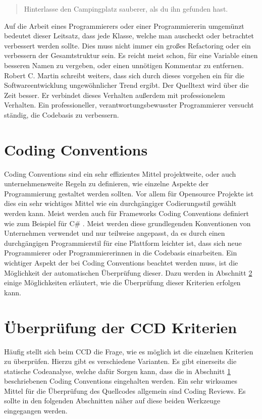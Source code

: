 \begin{quote}
	Hinterlasse den Campingplatz sauberer, als du ihn gefunden hast.
\end{quote}

\SuperPar Auf die Arbeit eines Programmierers oder einer Programmiererin umgemünzt bedeutet dieser Leitsatz, dass jede Klasse, welche man auscheckt oder betrachtet verbessert werden sollte. Dies muss nicht immer ein großes Refactoring oder ein verbessern der Gesamtstruktur sein. Es reicht meist schon, für eine Variable einen besseren Namen zu vergeben, oder einen unnötigen Kommentar zu entfernen. Robert C. Martin schreibt weiters, dass sich durch dieses vorgehen ein für die Softwareentwicklung ungewöhnlicher Trend ergibt. Der Quelltext wird über die Zeit besser. Er verbindet dieses Verhalten außerdem mit professionelem Verhalten. Ein professioneller, verantwortungsbewusster Programmierer versucht ständig, die Codebasis zu verbessern.

\section{Coding Conventions}
\label{cha:CodingConventions}
Coding Conventions sind ein sehr effizientes Mittel projektweite, oder auch unternehmensweite Regeln zu definieren, wie einzelne Aspekte der Programmierung gestaltet werden sollten. Vor allem für Opensource Projekte ist dies ein sehr wichtiges Mittel wie ein durchgängiger Codierungsstil gewählt werden kann. Meist werden auch für Frameworks Coding Conventions definiert wie zum Beispiel für C\# \cite{Microsoft2016}. Meist werden diese grundlegenden Konventionen von Unternehmen verwendet und nur teilweise angepasst, da es durch einen durchgängigen Programmierstil für eine Plattform leichter ist, dass sich neue Programmierer oder Programmiererinnen in die Codebasis einarbeiten. Ein wichtiger Aspekt der bei Coding Conventions beachtet werden muss, ist die Möglichkeit der automatischen Überprüfung dieser. Dazu werden in Abschnitt \ref{cha:CheckingCCDCriterias} einige Möglichkeiten erläutert, wie die Überprüfung dieser Kriterien erfolgen kann.

 
\section{Überprüfung der CCD Kriterien}
\label{cha:CheckingCCDCriterias}
Häufig stellt sich beim CCD die Frage, wie es möglich ist die einzelnen Kriterien zu überprüfen. Hierzu gibt es verschiedene Varianten. Es gibt einerseits die statische Codeanalyse, welche dafür Sorgen kann, dass die in Abschnitt \ref{cha:CodingConventions} beschriebenen Coding Conventions eingehalten werden. Ein sehr wirksames Mittel für die Überprüfung des Quellcodes allgemein sind Coding Reviews. Es sollte in den folgenden Abschnitten näher auf diese beiden Werkzeuge eingegangen werden.

